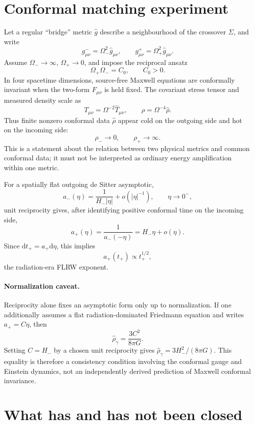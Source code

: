 \documentclass[11pt]{article}
\newcommand{\dd}{\mathrm{d}}
\begin{document}
\section{Conformal matching experiment}

Let a regular ``bridge'' metric $\hat g$ describe a neighbourhood of the crossover $\Sigma$, and write
\[
g^-_{\mu\nu}=\Omega_-^2\hat g_{\mu\nu},\qquad
g^+_{\mu\nu}=\Omega_+^2\hat g_{\mu\nu}.
\]
Assume $\Omega_-\to\infty$, $\Omega_+\to0$, and impose the reciprocal ansatz
\begin{equation}\label{eq:reciprocal}
\Omega_+\Omega_-=C_0,\qquad C_0>0.
\end{equation}
In four spacetime dimensions, source-free Maxwell equations are conformally invariant when the two-form $F_{\mu\nu}$ is held fixed.  The covariant stress tensor and measured density scale as
\[
T_{\mu\nu}=\Omega^{-2}\hat T_{\mu\nu},
\qquad \rho=\Omega^{-4}\hat\rho.
\]
Thus finite nonzero conformal data $\hat\rho$ appear cold on the outgoing side and hot on the incoming side:
\[
\rho_-\to0,\qquad \rho_+\to\infty.
\]
This is a statement about the relation between two physical metrics and common conformal data; it must not be interpreted as ordinary energy amplification within one metric.

For a spatially flat outgoing de Sitter asymptotic,
\[
a_-(\eta)=\frac{1}{H_-|\eta|}+o(|\eta|^{-1}),\qquad \eta\to0^-,
\]
unit reciprocity gives, after identifying positive conformal time on the incoming side,
\[
a_+(\eta)=\frac{1}{a_-(-\eta)}=H_-\eta+o(\eta).
\]
Since $\dd t_+=a_+\dd\eta$, this implies
\[
a_+(t_+)\propto t_+^{1/2},
\]
the radiation-era FLRW exponent.

\paragraph{Normalization caveat.}
Reciprocity alone fixes an asymptotic form only up to normalization.  If one additionally assumes a flat radiation-dominated Friedmann equation and writes $a_+=C\eta$, then
\[
\hat\rho_\gamma=\frac{3C^2}{8\pi G}.
\]
Setting $C=H_-$ by a chosen unit reciprocity gives $\hat\rho_\gamma=3H_-^2/(8\pi G)$.  This equality is therefore a consistency condition involving the conformal gauge and Einstein dynamics, not an independently derived prediction of Maxwell conformal invariance.

\section{What has and has not been closed}
\end{document}
